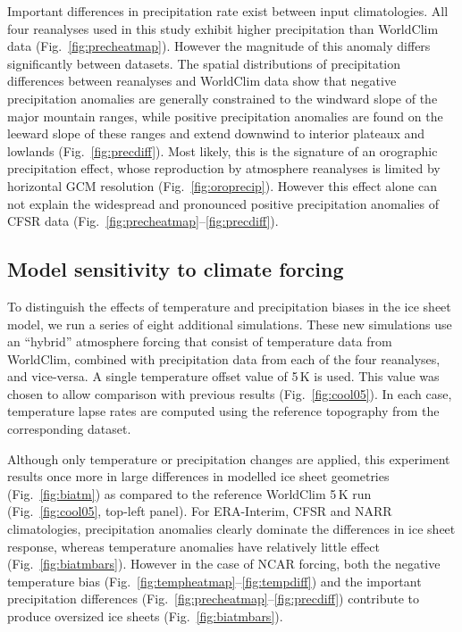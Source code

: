 Important differences in precipitation rate exist between input climatologies. All four reanalyses used in this study exhibit higher precipitation than WorldClim data (Fig.~\ref{fig:precheatmap}). However the magnitude of this anomaly differs significantly between datasets. The spatial distributions of precipitation differences between reanalyses and WorldClim data show that negative precipitation anomalies are generally constrained to the windward slope of the major mountain ranges, while positive precipitation anomalies are found on the leeward slope of these ranges and extend downwind to interior plateaux and lowlands (Fig.~\ref{fig:precdiff}). Most likely, this is the signature of an orographic precipitation effect, whose reproduction by atmosphere reanalyses is limited by horizontal GCM resolution (Fig.~\ref{fig:oroprecip}). However this effect alone can not explain the widespread and pronounced positive precipitation anomalies of CFSR data (Fig.~\ref{fig:precheatmap}--\ref{fig:precdiff}).

\subsection{Model sensitivity to climate forcing}

To distinguish the effects of temperature and precipitation biases in the ice sheet model, we run a series of eight additional simulations. These new simulations use an “hybrid” atmosphere forcing that consist of temperature data from WorldClim, combined with precipitation data from each of the four reanalyses, and vice-versa. A single temperature offset value of 5\,K is used. This value was chosen to allow comparison with previous results (Fig.~\ref{fig:cool05}). In each case, temperature lapse rates are computed using the reference topography from the corresponding dataset.

Although only temperature or precipitation changes are applied, this experiment results once more in large differences in modelled ice sheet geometries (Fig.~\ref{fig:biatm}) as compared to the reference WorldClim 5\,K run (Fig.~\ref{fig:cool05}, top-left panel). For ERA-Interim, CFSR and NARR climatologies, precipitation anomalies clearly dominate the differences in ice sheet response, whereas temperature anomalies have relatively little effect (Fig.~\ref{fig:biatmbars}). However in the case of NCAR forcing, both the negative temperature bias (Fig.~\ref{fig:tempheatmap}--\ref{fig:tempdiff}) and the important precipitation differences (Fig.~\ref{fig:precheatmap}--\ref{fig:precdiff}) contribute to produce oversized ice sheets (Fig.~\ref{fig:biatmbars}).


